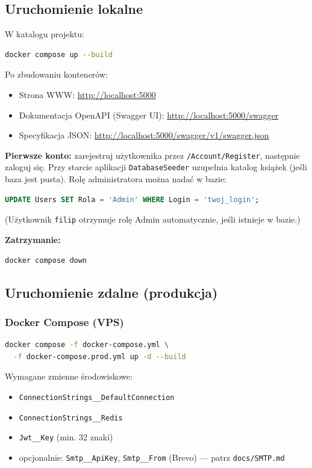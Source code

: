 \documentclass[12pt,a4paper]{article}
\begin{document}
\subsection{Uruchomienie lokalne}

W katalogu projektu:

\begin{lstlisting}[language=bash]
docker compose up --build
\end{lstlisting}

Po zbudowaniu kontenerów:
\begin{itemize}
    \item Strona WWW: \url{http://localhost:5000}
    \item Dokumentacja OpenAPI (Swagger UI): \url{http://localhost:5000/swagger}
    \item Specyfikacja JSON: \url{http://localhost:5000/swagger/v1/swagger.json}
\end{itemize}

\textbf{Pierwsze konto:} zarejestruj użytkownika przez \texttt{/Account/Register},
następnie zaloguj się. Przy starcie aplikacji \texttt{DatabaseSeeder} uzupełnia katalog
książek (jeśli baza jest pusta). Rolę administratora można nadać w bazie:
\begin{lstlisting}[language=sql]
UPDATE Users SET Rola = 'Admin' WHERE Login = 'twoj_login';
\end{lstlisting}
(Użytkownik \texttt{filip} otrzymuje rolę Admin automatycznie, jeśli istnieje w bazie.)

\textbf{Zatrzymanie:}
\begin{lstlisting}[language=bash]
docker compose down
\end{lstlisting}

\subsection{Uruchomienie zdalne (produkcja)}

\subsubsection{Docker Compose (VPS)}

\begin{lstlisting}[language=bash]
docker compose -f docker-compose.yml \
  -f docker-compose.prod.yml up -d --build
\end{lstlisting}

Wymagane zmienne środowiskowe:
\begin{itemize}
    \item \texttt{ConnectionStrings\_\_DefaultConnection}
    \item \texttt{ConnectionStrings\_\_Redis}
    \item \texttt{Jwt\_\_Key} (min. 32 znaki)
    \item opcjonalnie: \texttt{Smtp\_\_ApiKey}, \texttt{Smtp\_\_From} (Brevo) --- patrz \texttt{docs/SMTP.md}
\end{itemize}
\end{document}
